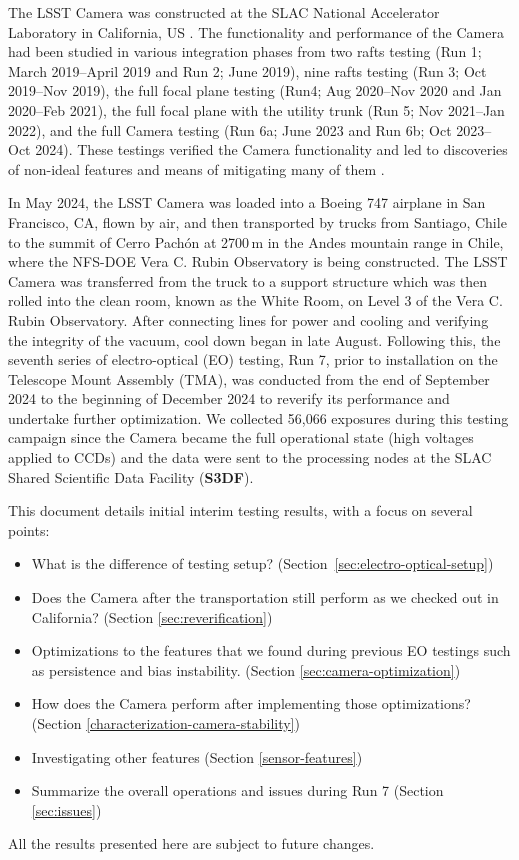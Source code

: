 
The LSST Camera was constructed at the SLAC National Accelerator Laboratory in California, US \citep{10.1117/12.3019302}.
The functionality and performance of the Camera had been studied in various integration phases from two rafts testing (Run 1; March 2019--April 2019 and Run 2; June 2019), nine rafts testing (Run 3; Oct 2019--Nov 2019), the full focal plane testing (Run4; Aug 2020--Nov 2020 and Jan 2020--Feb 2021), the full focal plane with the utility trunk (Run 5; Nov 2021--Jan 2022), and the full Camera testing (Run 6a; June 2023 and Run 6b; Oct 2023--Oct 2024)\citep{2024SPIE13096E..1SR}. These testings verified the Camera functionality and led to discoveries of non-ideal features and means of mitigating many of them \citep{2024SPIE13103E..0WU}.

In May 2024,  the LSST Camera was loaded into a Boeing 747 airplane in San Francisco, CA, flown by air, and then transported by trucks from Santiago, Chile to the summit of Cerro Pachón at 2700\,m in the Andes mountain range in Chile, where the NFS-DOE Vera C. Rubin Observatory is being constructed. The LSST Camera was transferred from the truck to a support structure which was then rolled into the clean room, known as the White Room, on Level 3 of the Vera C. Rubin Observatory. After connecting lines for power and cooling and verifying the integrity of the vacuum, cool down began in late August. Following this, the seventh series of electro-optical (EO) testing, Run 7, prior to installation on the Telescope Mount Assembly (TMA), was conducted from the end of September 2024 to the beginning of December 2024 to reverify its performance and undertake further optimization. We collected 56,066 exposures during this testing campaign since the Camera became the full operational state (high voltages applied to CCDs) and the data were sent to the processing nodes at the SLAC Shared Scientific Data Facility (\textbf{S3DF}).

This document details initial interim testing results, with a focus on several points:
\begin{itemize}
    \item What is the difference of testing setup? (Section~\ref{sec:electro-optical-setup})
    \item Does the Camera after the transportation still perform as we checked out in California? (Section \ref{sec:reverification})
    \item Optimizations to the features that we found during previous EO testings such as persistence and bias instability. (Section \ref{sec:camera-optimization})
    \item How does the Camera perform after implementing those optimizations? (Section \ref{characterization-camera-stability})
    \item Investigating other features (Section \ref{sensor-features})
    \item Summarize the overall operations and issues during Run 7 (Section \ref{sec:issues})
\end{itemize}
All the results presented here are subject to future changes.

